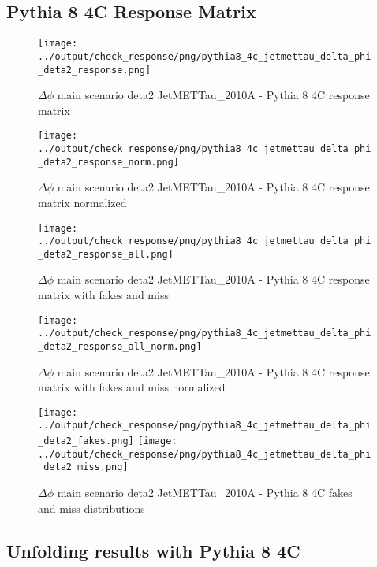 \documentclass[11pt]{book}
\begin{document}
\clearpage
\subsection{Pythia 8 4C Response Matrix}


\begin{figure}[ht]
\centering
\texttt{[image: ../output/check\_response/png/pythia8\_4c\_jetmettau\_delta\_phi\_deta2\_response.png]}
\caption{$\Delta\phi$ main scenario deta2 JetMETTau\_2010A - Pythia 8 4C response matrix}
\label{p8_jetmettau_delta_phi_deta2_response}
\end{figure}

\begin{figure}[ht]
\centering
\texttt{[image: ../output/check\_response/png/pythia8\_4c\_jetmettau\_delta\_phi\_deta2\_response\_norm.png]}
\caption{$\Delta\phi$ main scenario deta2 JetMETTau\_2010A - Pythia 8 4C response matrix normalized}
\label{p8_jetmettau_delta_phi_deta2_response_norm}
\end{figure}

\begin{figure}[ht]
\centering
\texttt{[image: ../output/check\_response/png/pythia8\_4c\_jetmettau\_delta\_phi\_deta2\_response\_all.png]}
\caption{$\Delta\phi$ main scenario deta2 JetMETTau\_2010A - Pythia 8 4C response matrix with fakes and miss}
\label{p8_jetmettau_delta_phi_deta2_response_all}
\end{figure}

\begin{figure}[ht]
\centering
\texttt{[image: ../output/check\_response/png/pythia8\_4c\_jetmettau\_delta\_phi\_deta2\_response\_all\_norm.png]}
\caption{$\Delta\phi$ main scenario deta2 JetMETTau\_2010A - Pythia 8 4C response matrix with fakes and miss normalized}
\label{p8_jetmettau_delta_phi_deta2_response_all_norm}
\end{figure}

\begin{figure}[ht]
\centering
\texttt{[image: ../output/check\_response/png/pythia8\_4c\_jetmettau\_delta\_phi\_deta2\_fakes.png]}
\texttt{[image: ../output/check\_response/png/pythia8\_4c\_jetmettau\_delta\_phi\_deta2\_miss.png]}
\caption{$\Delta\phi$ main scenario deta2 JetMETTau\_2010A - Pythia 8 4C fakes and miss distributions}
\label{p8_jetmettau_delta_phi_deta2_fakesmiss}
\end{figure}


\clearpage
\subsection{Unfolding results with Pythia 8 4C}
\end{document}

